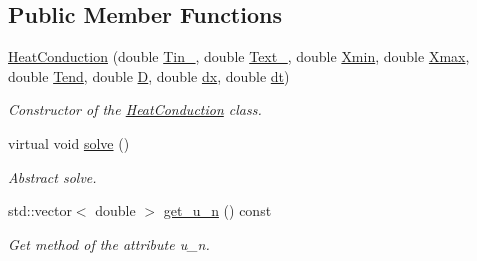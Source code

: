 \subsection*{Public Member Functions}
\begin{DoxyCompactItemize}
\item 
\hyperlink{class_heat_conduction_ab81631c27726b7048e49ac0b8fba9b23}{Heat\+Conduction} (double \hyperlink{class_heat_conduction_a2487010bf67582643ff59c0c5167725e}{Tin\+\_}, double \hyperlink{class_heat_conduction_aeb50fb3189fd6545f765ef73c9be7889}{Text\+\_}, double \hyperlink{class_heat_conduction_a6ccf374e13ab91b2403db617c9e7a8f0}{Xmin}, double \hyperlink{class_heat_conduction_a187dd05134300536dd9b5418e2957e9a}{Xmax}, double \hyperlink{class_heat_conduction_ab1d00caf79f4c04b420189eaf7c666e1}{Tend}, double \hyperlink{class_heat_conduction_a197d8aa3aa8619edaa640c243bdfc793}{D}, double \hyperlink{class_heat_conduction_a208bf1f475147b07a1f7d28533d78d9c}{dx}, double \hyperlink{class_heat_conduction_a7a7d5f6631039781c80b8c0c60e540e6}{dt})
\begin{DoxyCompactList}\small\item\em Constructor of the \hyperlink{class_heat_conduction}{Heat\+Conduction} class. \end{DoxyCompactList}\item 
virtual void \hyperlink{class_heat_conduction_ac176ea1a94c2fdb0da017b987ea22d1c}{solve} ()
\begin{DoxyCompactList}\small\item\em Abstract solve. \end{DoxyCompactList}\item 
std\+::vector$<$ double $>$ \hyperlink{class_heat_conduction_a97d3e5b07a0de19da5b1879208ae6bb3}{get\+\_\+u\+\_\+n} () const
\begin{DoxyCompactList}\small\item\em Get method of the attribute u\+\_\+n. \end{DoxyCompactList}\end{DoxyCompactItemize}
